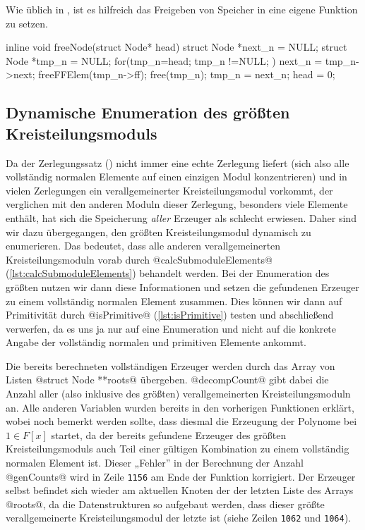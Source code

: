 Wie üblich in \Clang, ist es hilfreich das Freigeben von Speicher in eine 
eigene Funktion zu setzen.

\begin{ccode}[caption={Aus \url{../Sage/enumeratePCNs.c}},
  firstnumber=203, label=lst:freeNode]
inline void freeNode(struct Node* head){
    struct Node *next_n = NULL;
    struct Node *tmp_n = NULL;
    for(tmp_n=head; tmp_n !=NULL; ){
        next_n = tmp_n->next;
        freeFFElem(tmp_n->ff);
        free(tmp_n);
        tmp_n = next_n;
    }
    head = 0;
}
\end{ccode}

\subsection{Dynamische Enumeration des größten Kreisteilungsmoduls}
\label{sub:dynamische_enumeration}

Da der Zerlegungssatz () nicht immer eine echte
Zerlegung liefert (sich also alle vollständig normalen Elemente auf einen
einzigen Modul konzentrieren) und in vielen Zerlegungen ein verallgemeinerter
Kreisteilungsmodul vorkommt, der verglichen mit den anderen Moduln dieser
Zerlegung, besonders viele Elemente enthält, hat sich die Speicherung
\emph{aller} Erzeuger als schlecht erwiesen. Daher sind wir dazu übergegangen,
den größten Kreisteilungsmodul dynamisch zu enumerieren. Das bedeutet, dass
alle anderen verallgemeinerten Kreisteilungsmoduln vorab durch 
@calcSubmoduleElements@ (\autoref{lst:calcSubmoduleElements}) behandelt werden.
Bei der Enumeration des größten nutzen wir dann diese Informationen und setzen
die gefundenen Erzeuger zu einem vollständig normalen Element zusammen. Dies
können wir dann auf Primitivität durch @isPrimitive@
(\autoref{lst:isPrimitive}) testen und abschließend verwerfen, da es uns ja nur
auf eine Enumeration und nicht auf die konkrete Angabe der vollständig normalen
und primitiven Elemente ankommt.

Die bereits berechneten vollständigen Erzeuger werden durch 
das Array von Listen @struct Node **roots@ übergeben. @decompCount@ gibt dabei
die Anzahl aller (also inklusive des größten) verallgemeinerten
Kreisteilungsmoduln an. Alle anderen Variablen wurden bereits in den vorherigen
Funktionen erklärt, wobei noch bemerkt werden sollte, dass diesmal die
Erzeugung der Polynome bei $1 \in F[x]$ startet, da der bereits gefundene
Erzeuger des größten Kreisteilungsmoduls auch Teil einer gültigen Kombination
zu einem vollständig normalen Element ist. Dieser „Fehler” in der Berechnung
der Anzahl @genCounts@ wird in Zeile \texttt{1156} am Ende der Funktion
korrigiert. Der Erzeuger selbst befindet sich wieder am aktuellen Knoten der
der letzten Liste des Arrays @roots@, da die Datenstrukturen so
aufgebaut werden, dass dieser größte verallgemeinerte Kreisteilungsmodul der
letzte ist (siehe Zeilen \texttt{1062} und \texttt{1064}).


